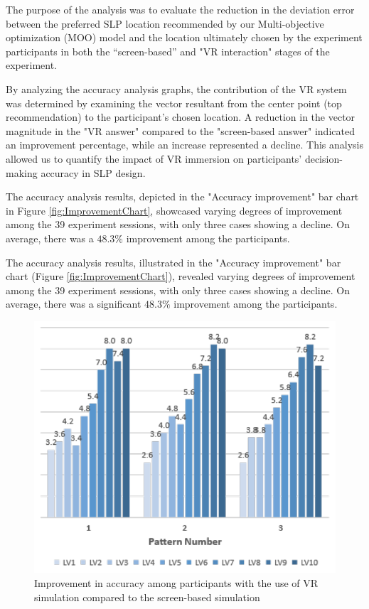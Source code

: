 The purpose of the analysis was to evaluate the reduction in the deviation error between the preferred SLP location recommended by our Multi-objective optimization (MOO) model and the location ultimately chosen by the experiment participants in both the ``screen-based'' and "VR interaction" stages of the experiment.

By analyzing the accuracy analysis graphs, the contribution of the VR system was determined by examining the vector resultant from the center point (top recommendation) to the participant's chosen location.
A reduction in the vector magnitude in the "VR answer" compared to the "screen-based answer" indicated an improvement percentage, while an increase represented a decline.
This analysis allowed us to quantify the impact of VR immersion on participants' decision-making accuracy in SLP design.

The accuracy analysis results, depicted in the "Accuracy improvement" bar chart in Figure \ref{fig:ImprovementChart}, showcased varying degrees of improvement among the 39 experiment sessions, with only three cases showing a decline.
On average, there was a \(48.3\%\) improvement among the participants.

The accuracy analysis results, illustrated in the "Accuracy improvement" bar chart (Figure \ref{fig:ImprovementChart}), revealed varying degrees of improvement among the 39 experiment sessions, with only three cases showing a decline.
On average, there was a significant \(48.3\%\) improvement among the participants.

    \begin{figure}[htb]
        \centering
        \includegraphics[width=\linewidth]{Images/ComplexityPerceptionChart}
        \caption{Improvement in accuracy among participants with the use of VR simulation compared to the screen-based simulation}
        \label{fig:ComplexityPerceptionChart}
    \end{figure}


